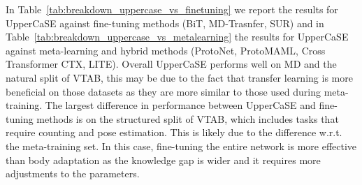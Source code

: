 \documentclass{article}
\begin{document}
In Table~\ref{tab:breakdown_uppercase_vs_finetuning} we report the results for UpperCaSE against fine-tuning methods (BiT, MD-Trasnfer, SUR) and in Table~\ref{tab:breakdown_uppercase_vs_metalearning} the results for UpperCaSE against meta-learning and hybrid methods (ProtoNet, ProtoMAML, Cross Transformer CTX, LITE). Overall UpperCaSE performs well on MD and the natural split of VTAB, this may be due to the fact that transfer learning is more beneficial on those datasets as they are more similar to those used during meta-training. The largest difference in performance between UpperCaSE and fine-tuning methods is on the structured split of VTAB, which includes tasks that require counting and pose estimation. This is likely due to the difference w.r.t. the meta-training set. In this case, fine-tuning the entire network is more effective than body adaptation as the knowledge gap is wider and it requires more adjustments to the parameters.
\end{document}
